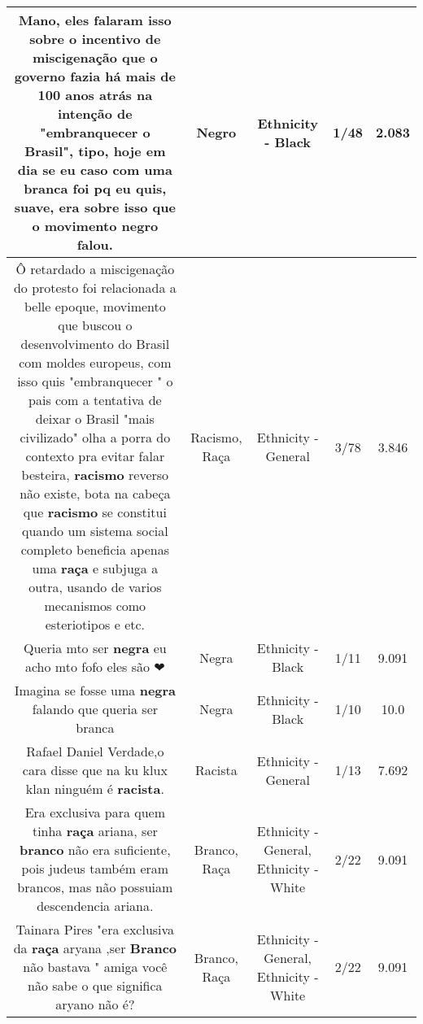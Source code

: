 \documentclass[11pt]{article}
\newlength\mylength
\begin{document}
\begin{center}
\begin{longtable}{|C{.65\mylength}|C{.30\mylength}|C{.12\mylength}|C{.12\mylength}|C{.12\mylength}|}
  \small Mano, eles falaram isso sobre o incentivo de miscigenação que o governo fazia há mais de 100 anos atrás na intenção de "embranquecer o Brasil", tipo, hoje em dia se eu caso com uma branca foi pq eu quis, suave, era sobre isso que o movimento \textbf{negro} falou.\normalsize   & Negro & Ethnicity - Black & 1/48 & 2.083 \\  \hline
  \small Ô retardado a miscigenação do protesto foi relacionada a belle epoque, movimento que buscou o desenvolvimento do Brasil com moldes europeus, com isso quis "embranquecer " o pais com a tentativa de deixar o Brasil "mais civilizado" olha a porra do contexto pra evitar falar besteira, \textbf{racismo} reverso não  existe, bota na cabeça que \textbf{racismo} se constitui quando um sistema social completo beneficia apenas uma \textbf{raça} e subjuga a outra, usando de varios mecanismos como esteriotipos e etc.\normalsize   & Racismo, Raça & Ethnicity - General & 3/78 & 3.846 \\  \hline
  \small Queria mto ser \textbf{negra} eu acho mto fofo eles são ❤\normalsize   & Negra & Ethnicity - Black & 1/11 & 9.091 \\  \hline
  \small Imagina se fosse uma \textbf{negra} falando que queria ser branca\normalsize   & Negra & Ethnicity - Black & 1/10 & 10.0 \\  \hline
  \small Rafael Daniel Verdade,o cara disse que na ku klux klan ninguém é \textbf{racista}.\normalsize   & Racista & Ethnicity - General & 1/13 & 7.692 \\  \hline
  \small Era exclusiva para quem tinha \textbf{raça} ariana, ser \textbf{branco} não era suficiente, pois judeus também eram brancos, mas não possuiam descendencia ariana.\normalsize   & Branco, Raça & Ethnicity - General, Ethnicity - White & 2/22 & 9.091 \\  \hline
  \small Tainara Pires "era exclusiva da \textbf{raça} aryana ,ser \textbf{Branco} não bastava " amiga você não sabe o que significa aryano não é?\normalsize   & Branco, Raça & Ethnicity - General, Ethnicity - White & 2/22 & 9.091 \\  \hline

\end{longtable}
\end{center}
\end{document}
